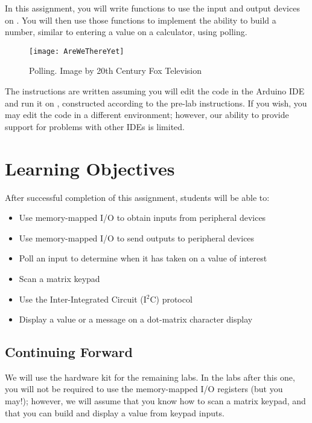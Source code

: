 In this assignment, you will write functions to use the input and output
devices on \runtimeenvironment. You will then use those functions to implement
the ability to build a number, similar to entering a value on a calculator,
using polling.

\begin{figure}[h]
    \centering
    \texttt{[image: AreWeThereYet]}
    \caption{Polling. \tiny Image by 20th Century Fox Television}
\end{figure}

The instructions are written assuming you will edit the code in the Arduino IDE
and run it on \runtimeenvironment, constructed according to the pre-lab
instructions. If you wish, you may edit the code in a different environment;
however, our ability to provide support for problems with other IDEs is limited.

\section*{Learning Objectives}

After successful completion of this assignment, students will be able to:
\begin{itemize}
\item Use memory-mapped I/O to obtain inputs from peripheral devices
\item Use memory-mapped I/O to send outputs to peripheral devices
\item Poll an input to determine when it has taken on a value of interest
\item Scan a matrix keypad
\item Use the Inter-Integrated Circuit (I$^2$C) protocol
\item Display a value or a message on a dot-matrix character display
\end{itemize}

\subsection*{Continuing Forward}

We will use the hardware kit for the remaining labs. In the labs after this one,
you will not be required to use the memory-mapped I/O registers (but you may!);
however, we will assume that you know how to scan a matrix keypad, and that you
can build and display a value from keypad inputs.

